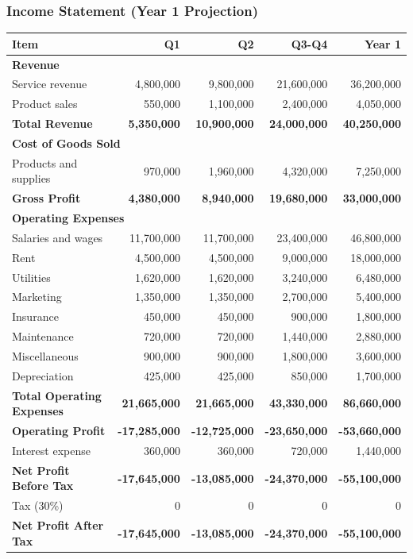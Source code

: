 \vspace{1em}

\subsubsection{Income Statement (Year 1 Projection)}

\begin{tabular}{|l|r|r|r|r|}
\hline
\textbf{Item} & \textbf{Q1} & \textbf{Q2} & \textbf{Q3-Q4} & \textbf{Year 1} \\
\hline
\multicolumn{5}{|l|}{\textbf{Revenue}} \\
Service revenue & 4,800,000 & 9,800,000 & 21,600,000 & 36,200,000 \\
Product sales & 550,000 & 1,100,000 & 2,400,000 & 4,050,000 \\
\hline
\textbf{Total Revenue} & \textbf{5,350,000} & \textbf{10,900,000} & \textbf{24,000,000} & \textbf{40,250,000} \\
\hline
\multicolumn{5}{|l|}{\textbf{Cost of Goods Sold}} \\
Products and supplies & 970,000 & 1,960,000 & 4,320,000 & 7,250,000 \\
\hline
\textbf{Gross Profit} & \textbf{4,380,000} & \textbf{8,940,000} & \textbf{19,680,000} & \textbf{33,000,000} \\
\hline
\multicolumn{5}{|l|}{\textbf{Operating Expenses}} \\
Salaries and wages & 11,700,000 & 11,700,000 & 23,400,000 & 46,800,000 \\
Rent & 4,500,000 & 4,500,000 & 9,000,000 & 18,000,000 \\
Utilities & 1,620,000 & 1,620,000 & 3,240,000 & 6,480,000 \\
Marketing & 1,350,000 & 1,350,000 & 2,700,000 & 5,400,000 \\
Insurance & 450,000 & 450,000 & 900,000 & 1,800,000 \\
Maintenance & 720,000 & 720,000 & 1,440,000 & 2,880,000 \\
Miscellaneous & 900,000 & 900,000 & 1,800,000 & 3,600,000 \\
Depreciation & 425,000 & 425,000 & 850,000 & 1,700,000 \\
\hline
\textbf{Total Operating Expenses} & \textbf{21,665,000} & \textbf{21,665,000} & \textbf{43,330,000} & \textbf{86,660,000} \\
\hline
\textbf{Operating Profit} & \textbf{-17,285,000} & \textbf{-12,725,000} & \textbf{-23,650,000} & \textbf{-53,660,000} \\
\hline
Interest expense & 360,000 & 360,000 & 720,000 & 1,440,000 \\
\hline
\textbf{Net Profit Before Tax} & \textbf{-17,645,000} & \textbf{-13,085,000} & \textbf{-24,370,000} & \textbf{-55,100,000} \\
\hline
Tax (30\%) & 0 & 0 & 0 & 0 \\
\hline
\textbf{Net Profit After Tax} & \textbf{-17,645,000} & \textbf{-13,085,000} & \textbf{-24,370,000} & \textbf{-55,100,000} \\
\hline
\end{tabular}


